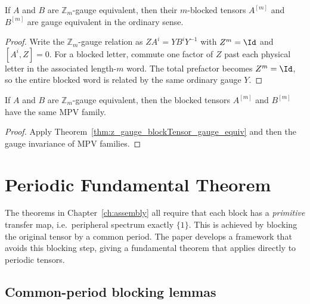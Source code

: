 \begin{theorem}
    \label{thm:z_gauge_blockTensor_gauge_equiv}
    \leanok
    If $A$ and $B$ are $\mathbb Z_m$-gauge equivalent, then their $m$-blocked
    tensors $A^{[m]}$ and $B^{[m]}$ are gauge equivalent in the ordinary sense.
\end{theorem}

\begin{proof}\leanok
    Write the $\mathbb Z_m$-gauge relation as
    $Z A^i = Y B^i Y^{-1}$ with $Z^m = \Id$ and $[A^i, Z] = 0$.
    For a blocked letter, commute one factor of $Z$ past each physical letter in
    the associated length-$m$ word. The total prefactor becomes $Z^m = \Id$,
    so the entire blocked word is related by the same ordinary gauge $Y$.
\end{proof}

\begin{corollary}
    \label{cor:z_gauge_blockTensor_same_mpv}
    \leanok
    If $A$ and $B$ are $\mathbb Z_m$-gauge equivalent, then the blocked tensors
    $A^{[m]}$ and $B^{[m]}$ have the same MPV family.
\end{corollary}

\begin{proof}\leanok
    Apply Theorem~\ref{thm:z_gauge_blockTensor_gauge_equiv} and then the gauge
    invariance of MPV families.
\end{proof}

\section{Periodic Fundamental Theorem}%
\label{sec:periodic_ft}

The theorems in Chapter~\ref{ch:assembly} all require that each block has a
\emph{primitive} transfer map, i.e.\ peripheral spectrum exactly $\{1\}$.
This is achieved by blocking the original tensor by a common period.
The paper \cite{DeLasCuevas2017Irreducible} develops a framework that
avoids this blocking step, giving a fundamental theorem that applies
directly to periodic tensors.

\subsection{Common-period blocking lemmas}

